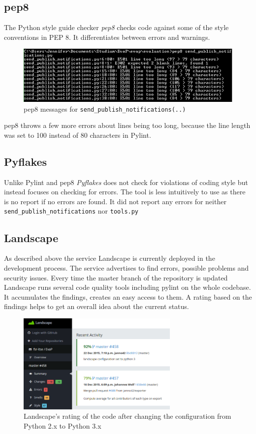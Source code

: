 \subsection{pep8}
The Python style guide checker \emph{pep8} checks code against some of the style conventions in PEP 8.
It differentiates between errors and warnings.
\begin{figure}[h]
    \centering
    \includegraphics[width=\textwidth, keepaspectratio]{graphics/pep8_send_publish_notifications_1}
    \caption{pep8 messages for \texttt{send\_publish\_notifications(..)}}
    \label{fig:pep8}
\end{figure} 
pep8 throws a few more errors about lines being too long, because the line length was set to 100 instead of 80 characters in Pylint.

\subsection{Pyflakes}
Unlike Pylint and pep8 \emph{Pyflakes} does not check for violations of coding style but instead focuses on checking for errors.
The tool is less intuitively to use as there is no report if no errors are found. 
It did not report any errors for neither \texttt{send\_publish\_notifications} nor \texttt{tools.py}

\subsection{Landscape}
As described above the service Landscape is currently deployed in the development process. 
The service advertises to find errors, possible problems and security issues.
Every time the master branch of the repository is updated Landscape runs several code quality tools including pylint on the whole codebase. 
It accumulates the findings, creates an easy access to them.
A rating based on the findings helps to get an overall idea about the current status.

\begin{figure}[h]
    \centering
    \includegraphics[width=0.7\textwidth, keepaspectratio]{graphics/landscape_python3}
    \caption{Landscape's rating of the code after changing the configuration from Python 2.x to Python 3.x}
    \label{fig:landscape_Python3}
\end{figure} 

